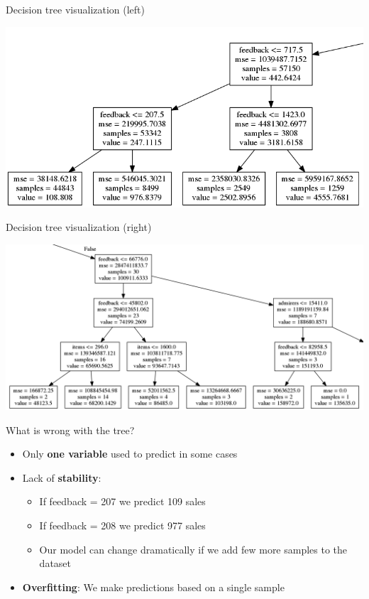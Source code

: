 \begin{frame}[fragile]{Decision tree visualization (left)}
    \begin{center}
        \includegraphics[scale=.40]{images/etsy_tree_left}
    \end{center}
\end{frame}

\begin{frame}[fragile]{Decision tree visualization (right)}
    \begin{center}
        \includegraphics[scale=.30]{images/etsy_tree_right}
    \end{center}
\end{frame}

\begin{frame}[fragile]{What is wrong with the tree?}
    \begin{itemize}
        \item Only \textbf{one variable} used to predict in some cases
        \item Lack of \textbf{stability}:
        \begin{itemize}
            \item If feedback = 207 we predict 109 sales
            \item If feedback = 208 we predict 977 sales
            \item Our model can change dramatically if we add few more samples to the dataset
        \end{itemize}
        \item \textbf{Overfitting}: We make predictions based on a single sample
    \end{itemize}

\end{frame}

